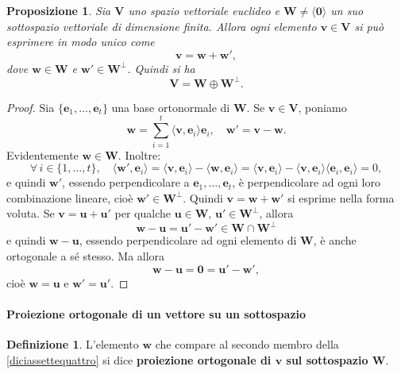 \documentclass{article}
\theoremstyle{plain}
\newtheorem{prop}[thm]{Proposizione}
\theoremstyle{definition}
\newtheorem{defn}{Definizione}[section]
\theoremstyle{remark}
\begin{document}
\begin{bxthm}
\begin{prop}
Sia $\mathbf{V}$ uno spazio vettoriale euclideo e $\mathbf{W} \neq \langle\mathbf{0}\rangle$ un suo sottospazio 
vettoriale di dimensione finita. Allora ogni elemento $\mathbf{v} \in \mathbf{V}$ si può esprimere in modo unico come
\begin{equation}\label{diciassettequattro}
    \mathbf{v} = \mathbf{w} + \mathbf{w}',
\end{equation}
dove $\mathbf{w} \in \mathbf{W}$ e $\mathbf{w}' \in \mathbf{W}^\perp$. Quindi si ha
\[
\mathbf{V} = \mathbf{W} \oplus \mathbf{W}^\perp.
\]    
\end{prop}
\end{bxthm}
\begin{proof}
Sia $\{ \mathbf{e}_1, \ldots, \mathbf{e}_t \}$ una base ortonormale di $\mathbf{W}$. 
Se $\mathbf{v} \in \mathbf{V}$, poniamo
\[
\mathbf{w} = \sum_{i=1}^{t}\langle \mathbf{v}, \mathbf{e}_i \rangle \mathbf{e}_i,
\quad
\mathbf{w}' = \mathbf{v} - \mathbf{w}.
\]
Evidentemente $\mathbf{w} \in \mathbf{W}$. Inoltre:
\[
\forall\,i \in \{1, \ldots, t\},\quad
\langle \mathbf{w}', \mathbf{e}_i \rangle = \langle \mathbf{v}, \mathbf{e}_i \rangle - \langle \mathbf{w}, \mathbf{e}_i \rangle = \langle \mathbf{v}, \mathbf{e}_i \rangle - \langle \mathbf{v}, \mathbf{e}_i \rangle \langle\mathbf{e}_i,\mathbf{e}_i\rangle=0,
\]
e quindi $\mathbf{w}'$, essendo perpendicolare a $\mathbf{e}_1, \ldots, \mathbf{e}_t$, è perpendicolare ad 
ogni loro combinazione lineare, cioè $\mathbf{w}' \in \mathbf{W}^\perp$. Quindi $\mathbf{v} = \mathbf{w} + \mathbf{w}'$ si esprime nella forma voluta.
Se $\mathbf{v} = \mathbf{u} + \mathbf{u}'$ per qualche $\mathbf{u} \in \mathbf{W},\,\mathbf{u}' \in \mathbf{W}^\perp$, allora
\[
\mathbf{w} - \mathbf{u} = \mathbf{u}' - \mathbf{w}' \in \mathbf{W} \cap \mathbf{W}^\perp
\]
e quindi $\mathbf{w} - \mathbf{u}$, essendo perpendicolare ad ogni elemento di $\mathbf{W}$, è anche ortogonale 
a sé stesso. Ma allora 
\[
\mathbf{w} - \mathbf{u} = \mathbf{0} = \mathbf{u}' - \mathbf{w}',
\]
cioè $\mathbf{w} = \mathbf{u}$ e $\mathbf{w}' = \mathbf{u}'$.
\end{proof}

\vspace{10pt}

\paragraph{Proiezione ortogonale di un vettore su un sottospazio}
\begin{bxthm}
\begin{defn}
L'elemento $\mathbf{w}$ che compare al secondo membro della \ref{diciassettequattro} si dice \textbf{proiezione ortogonale di $\mathbf{v}$ sul sottospazio $\mathbf{W}$}.    
\end{defn}
\end{bxthm}
\end{document}
